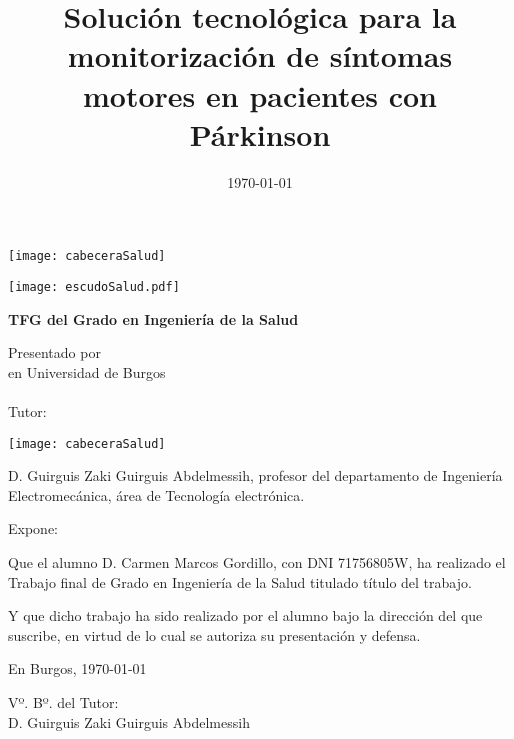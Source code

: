 \documentclass[a4paper,12pt,twoside]{memoir}
\title{Solución tecnológica para la monitorización de síntomas motores en pacientes con Párkinson}
\author{\nombre}
\date{\today}
\makeatletter
\def\maketitle{
  \null
  \thispagestyle{empty}
\begin{center}
  \noindent\texttt{[image: cabeceraSalud]}\vspace{1.5cm}%
\end{center}
  
  \begin{center}
    \begin{minipage}[c][1.5cm][c]{.20\textwidth}
        \texttt{[image: escudoSalud.pdf]}
    \end{minipage}
  \end{center}
  
  \begin{center}
    \colorbox{cpardoBox}{%
        \begin{minipage}{.8\textwidth}
          \vspace{.5cm}\Large
          \begin{center}
          \textbf{TFG del Grado en Ingeniería de la Salud}\vspace{.6cm}\\
          \textbf{\LARGE\@title{}}
          \end{center}
          \vspace{.2cm}
        \end{minipage}
    }%
  \end{center}
  
  \begin{center}%
  {%
    \noindent\LARGE
    Presentado por \@author{}\\ 
    en Universidad de Burgos\\
    \vspace{0.5cm}
    \noindent\Large
    \@date{}\\
    \vspace{0.5cm}
    Tutor: \@tutor{}\\
  }%
  \end{center}%
  \null
  \cleardoublepage
  }
\newcommand{\nombre}{Carmen Marcos Gordillo}
\newcommand{\nombreTutor}{Guirguis Zaki Guirguis Abdelmessih}
\newcommand{\dni}{71756805W}
\makeatother
\begin{document}
\maketitle


\newpage\null\thispagestyle{empty}\newpage

\thispagestyle{empty}


\noindent\texttt{[image: cabeceraSalud]}\vspace{1cm}

\noindent D. \nombreTutor, profesor del departamento de Ingeniería Electromecánica, área de Tecnología electrónica.

\noindent Expone:

\noindent Que el alumno D. \nombre, con DNI \dni, ha realizado el Trabajo final de Grado en Ingeniería de la Salud titulado título del trabajo. 

\noindent Y que dicho trabajo ha sido realizado por el alumno bajo la dirección del que suscribe, en virtud de lo cual se autoriza su presentación y defensa.

\begin{center} %
En Burgos, {\large \today}
\end{center}

\vfill\vfill\vfill

\begin{minipage}{0.45\textwidth}
\begin{flushleft} %
Vº. Bº. del Tutor:\\[2cm]
D. \nombreTutor
\end{flushleft}
\end{minipage}
\hfill
\begin{minipage}{0.45\textwidth}

\end{minipage}
\hfill

\vfill



\newpage\null\thispagestyle{empty}\newpage




\frontmatter
\end{document}
